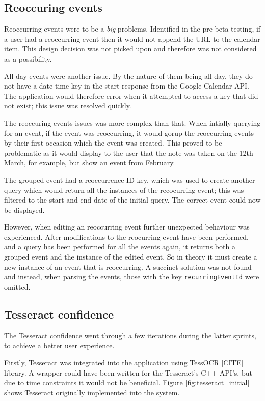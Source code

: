\subsection{Reoccuring events}
Reoccurring events were to be a \textit{big} problems. Identified in the pre-beta testing, if a user had a reoccurring event then it would not append the URL to the calendar item. This design decision was not picked upon and therefore was not considered as a possibility.

All-day events were another issue. By the nature of them being all day, they do not have a date-time key in the start response from the Google Calendar API. The application would therefore error when it attempted to access a key that did not exist; this issue was resolved quickly.

The reoccuring events issues was more complex than that. When intially querying for an event, if the event was reoccurring, it would gorup the reoccurring events by their first occasion which the event was created. This proved to be problematic as it would display to the user that the note was taken on the 12th March, for example, but show an event from February.

The grouped event had a reoccurrence ID key, which was used to create another query which would return all the instances of the recocurring event; this was filtered to the start and end date of the initial query. The correct event could now be displayed.

However, when editing an reoccurring event further unexpected behaviour was experienced. After modifications to the reocurring event have been performed, and a query has been performed for all the events again, it returns both a grouped event and the instance of the edited event. So in theory it must create a new instance of an event that is reoccurring. A succinct solution was not found and instead, when parsing the events, those with the key \texttt{recurringEventId} were omitted.

\subsection{Tesseract confidence}
The Tesseract confidence went through a few iterations during the latter sprints, to achieve a better user experience.

Firstly, Tesseract was integrated into the application using TessOCR [CITE] library. A wrapper could have been written for the Tesseract's C++ API's, but due to time constraints it would not be beneficial. Figure \ref{fig:tesseract_initial} shows Tesseract originally implemented into the system.

